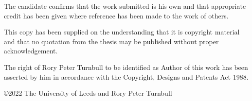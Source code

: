 
\begin{declaration}

The candidate confirms that the work submitted is his own and that appropriate credit has been given where reference has been made to the work of others.

This copy has been supplied on the understanding that it is copyright material and that no quotation from the thesis may be published without proper acknowledgement.

The right of Rory Peter Turnbull to be identified as Author of this work has been asserted by him in accordance with the Copyright, Designs and Patents Act 1988.

\copyright 2022 The University of Leeds and Rory Peter Turnbull


\end{declaration}

